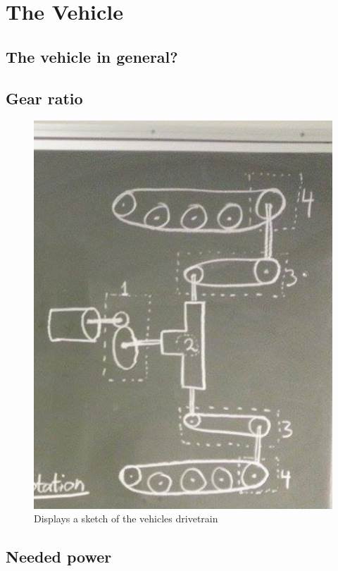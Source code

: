 \section{The Vehicle}

\subsection{The vehicle in general?}

\subsection{Gear ratio}


 \begin{figure}[H]
	\centering
	\includegraphics[scale=0.8]{figures/Drivetrain.jpg}
	\caption{Displays a sketch of the vehicles drivetrain}
	\label{fig:Drivetrain}
\end{figure}

\subsection{Needed power}

